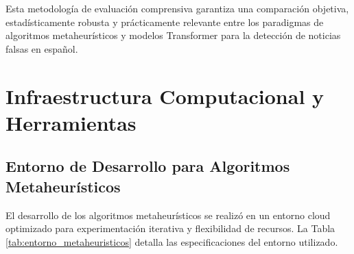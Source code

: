 Esta metodología de evaluación comprensiva garantiza una comparación objetiva, estadísticamente robusta y prácticamente relevante entre los paradigmas de algoritmos metaheurísticos y modelos Transformer para la detección de noticias falsas en español.

\section{Infraestructura Computacional y Herramientas}
\label{sec:infraestructura}

\subsection{Entorno de Desarrollo para Algoritmos Metaheurísticos}

El desarrollo de los algoritmos metaheurísticos se realizó en un entorno cloud optimizado para experimentación iterativa y flexibilidad de recursos. La Tabla \ref{tab:entorno_metaheuristicos} detalla las especificaciones del entorno utilizado.

\begin{table}[htbp]
\centering
{}
\caption{Especificaciones del entorno de desarrollo para algoritmos metaheurísticos.}
\label{tab:entorno_metaheuristicos}
\end{table}

